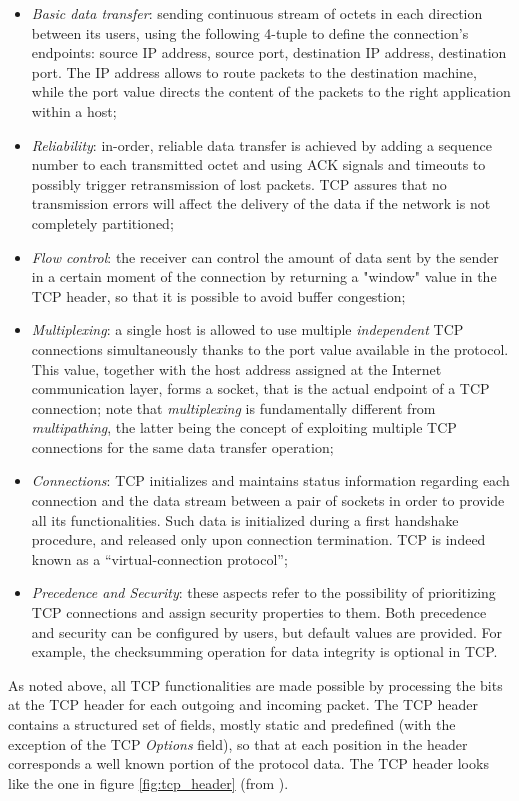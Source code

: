 \begin{itemize}
  \item \textit{Basic data transfer}: sending continuous stream of octets in each direction between its users, using the following 4-tuple to define the connection's endpoints: source IP address, source port, destination IP address, destination port. The IP address allows to route packets to the destination machine, while the port value directs the content of the packets to the right application within a host;
  \item \textit{Reliability}: in-order, reliable data transfer is achieved by adding a sequence number to each transmitted octet and using ACK signals and timeouts to possibly trigger retransmission of lost packets. TCP assures that no transmission errors will affect the delivery of the data if the network is not completely partitioned;
  \item \textit{Flow control}: the receiver can control the amount of data sent by the sender in a certain moment of the connection by returning a "window" value in the TCP header, so that it is possible to avoid buffer congestion;
  \item \textit{Multiplexing}: a single host is allowed to use multiple \textit{independent} TCP connections simultaneously thanks to the port value available in the protocol. This value, together with the host address assigned at the Internet communication layer, forms a socket, that is the actual endpoint of a TCP connection; note that \textit{multiplexing} is fundamentally different from \textit{multipathing}, the latter being the concept of exploiting multiple TCP connections for the same data transfer operation;
  \item \textit{Connections}: TCP initializes and maintains status information regarding each connection and the data stream between a pair of sockets in order to provide all its functionalities. Such data is initialized during a first handshake procedure, and released only upon connection termination. TCP is indeed known as a ``virtual-connection protocol'';
  \item \textit{Precedence and Security}: these aspects refer to the possibility of prioritizing TCP connections and assign security properties to them. Both precedence and security can be configured by users, but default values are provided. For example, the checksumming operation for data integrity is optional in TCP.
\end{itemize}

As noted above, all TCP functionalities are made possible by processing the bits at the TCP header for each outgoing and incoming packet. The TCP header contains a structured set of fields, mostly static and predefined (with the exception of the TCP \textit{Options} field), so that at each position in the header corresponds a well known portion of the protocol data. The TCP header looks like the one in figure \ref{fig:tcp_header} (from ).


